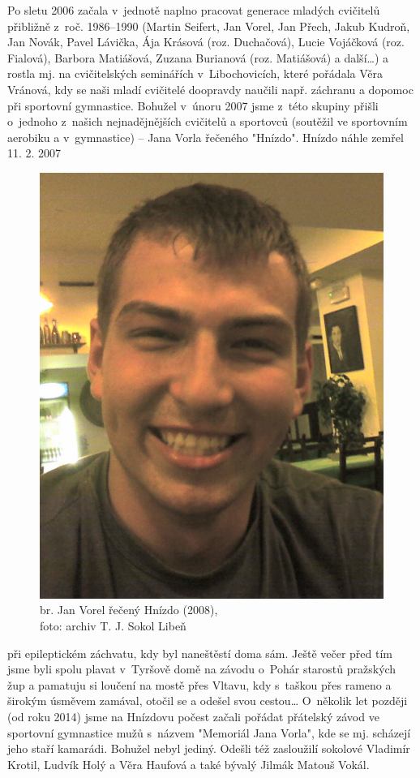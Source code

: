 \documentclass[a5paper, 11pt, twoside]{article}
\begin{document}
Po sletu 2006 začala v~jednotě naplno pracovat generace mladých
cvičitelů přibližně z~roč. 1986--1990 (Martin Seifert, Jan Vorel, Jan
Přech, Jakub Kudroň, Jan Novák, Pavel Lávička, Ája Krásová (roz.
Duchačová), Lucie Vojáčková (roz. Fialová), Barbora Matiášová, Zuzana Burianová (roz. Matiášová) a
další\ldots) a rostla mj. na cvičitelských seminářích v~Libochovicích,
které pořádala Věra Vránová, kdy se naši mladí cvičitelé doopravdy
naučili např. záchranu a dopomoc při sportovní gymnastice. Bohužel
v~únoru 2007 jsme z~této skupiny přišli o~jednoho z~našich nejnadějnějších
cvičitelů a sportovců (soutěžil ve sportovním aerobiku a v~gymnastice)
-- Jana Vorla řečeného "Hnízdo". Hnízdo náhle zemřel 11. 2. 2007
\begin{figure}
  \includegraphics[width=0.9\linewidth]{img/57_hnizdo.jpg}
  \caption*{br. Jan Vorel řečený Hnízdo (2008),\\foto: archiv T. J. Sokol
  Libeň}
\end{figure}
při epileptickém záchvatu, kdy byl naneštěstí doma sám. Ještě večer před tím
jsme byli spolu plavat v~Tyršově domě na závodu o~Pohár starostů
pražských žup a pamatuju si loučení na mostě přes Vltavu, kdy s~taškou
přes rameno a širokým úsměvem zamával, otočil se a odešel svou
cestou\ldots{} O~několik let později (od roku 2014) jsme na Hnízdovu
počest začali pořádat přátelský závod ve sportovní gymnastice mužů
s~názvem "Memoriál Jana Vorla", kde se mj. scházejí jeho staří kamarádi.
Bohužel nebyl jediný. Odešli též zasloužilí sokolové Vladimír Krotil,
Ludvík Holý a Věra Haufová a také bývalý Jilmák Matouš Vokál.
\end{document}
